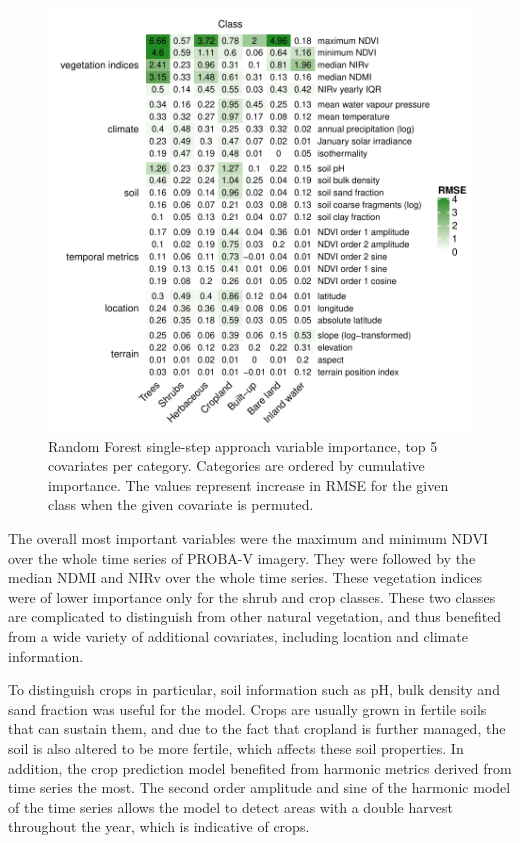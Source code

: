 \documentclass[review,authoryear,3p]{elsarticle}
\begin{document}
\begin{figure}
    \centering
    \includegraphics[width=14cm]{article-figures/heatmaps/2020-06-19-varimp-heatmap-top5}
    \caption{Random Forest single-step approach variable importance, top 5 covariates per category. Categories are ordered by cumulative importance. The values represent increase in RMSE for the given class when the given covariate is permuted.}
    \label{fig-varimp}
\end{figure}

The overall most important variables were the maximum and minimum \gls{NDVI} over the whole time series of PROBA-V imagery.
They were followed by the median \gls{NDMI} and \gls{NIRv} over the whole time series.
These vegetation indices were of lower importance only for the shrub and crop classes.
These two classes are complicated to distinguish from other natural vegetation, and thus benefited from a wide variety of additional covariates, including location and climate information.

To distinguish crops in particular, soil information such as pH, bulk density and sand fraction was useful for the model.
Crops are usually grown in fertile soils that can sustain them, and due to the fact that cropland is further managed, the soil is also altered to be more fertile, which affects these soil properties.
In addition, the crop prediction model benefited from harmonic metrics derived from time series the most.
The second order amplitude and sine of the harmonic model of the time series allows the model to detect areas with a double harvest throughout the year, which is indicative of crops.
\end{document}
